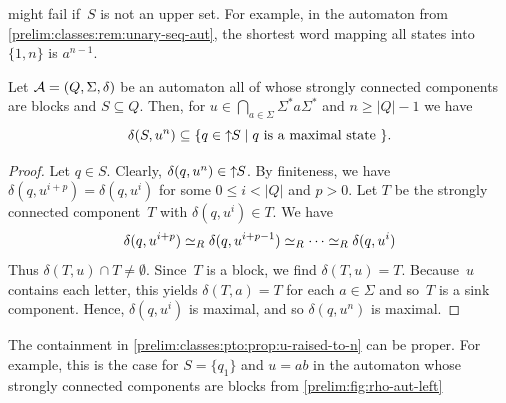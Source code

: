 might fail if~$S$ is not an upper set. For example, 
in the automaton from \cref{prelim:classes:rem:unary-seq-aut},
the shortest word mapping all states into $\{1, n\}$
is $a^{n - 1}$.





\begin{proposition} \label{prelim:classes:pto:prop:u-raised-to-n}
	Let $\mathcal A = (Q, \Sigma, \delta)$ be an automaton all of whose strongly connected components are blocks and $S \subseteq Q$. Then, for $u \in \bigcap_{a \in \Sigma} \Sigma^* a \Sigma^*$
	and $n \ge |Q| - 1$	we have
	\[
	\delta(S, u^{n}) \subseteq \{ q \in \mbox{\ensuremath{\displaystyle \uparrow \!\!S}} \mid q \text{ is a maximal state } \}. 
	\]
\end{proposition}
\begin{proof}
	Let $q \in S$. Clearly, $\delta(q, u^n) \in \mbox{\ensuremath{\displaystyle \uparrow \!\!S}}$.
	By finiteness,
	we have $\delta(q, u^{i + p}) = \delta(q, u^i)$
	for some $0 \le i < |Q|$ and $p > 0$.
	Let $T$ be the strongly connected component~$T$
	with $\delta(q, u^i) \in T$.
	We have 
	\[
	\delta(q, u^{i+p}) \simeq_R \delta(q, u^{i+p-1}) \simeq_R \cdots \simeq_R \delta(q, u^{i})
	\]
	Thus $\delta(T, u) \cap T \ne \emptyset$.
	Since~$T$ is a block, we find $\delta(T, u) = T$.
	Because~$u$ contains each letter,
	this yields $\delta(T, a) = T$
	for each $a \in \Sigma$
	and so~$T$ is a sink component.
	Hence, $\delta(q, u^i)$ is maximal,
	and so $\delta(q, u^n)$ is maximal.	
\end{proof}

The containment in \cref{prelim:classes:pto:prop:u-raised-to-n} 
can be proper. For example, this is the case for $S = \{q_1\}$ and $u = ab$ in 
the automaton whose strongly connected components are blocks from \cref{prelim:fig:rho-aut-left}

